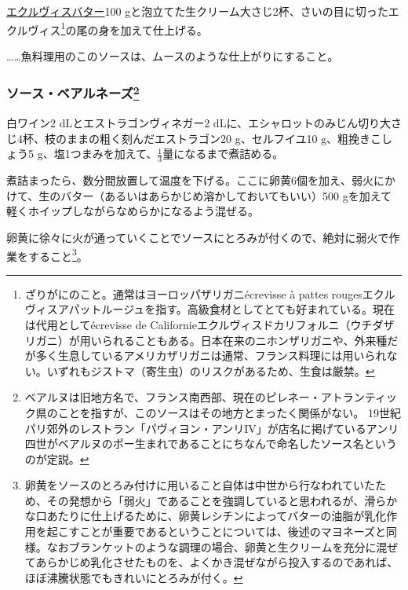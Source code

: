 \begin{recette}
\protect\hyperlink{beurre-d-ecrevisse}{エクルヴィスバター}100
gと泡立てた生クリーム大さじ2杯、さいの目に切ったエクルヴィス\footnote{ざりがにのこと。通常はヨーロッパザリガニécrevisse
  à pattes
  rougesエクルヴィスアパットルージュを指す。高級食材としてとても好まれている。現在は代用としてécrevisse
  de
  Californieエクルヴィスドカリフォルニ（ウチダザリガニ）が用いられることもある。日本在来のニホンザリガニや、外来種だが多く生息しているアメリカザリガニは通常、フランス料理には用いられない。いずれもジストマ（寄生虫）のリスクがあるため、生食は厳禁。}の尾の身を加えて仕上げる。

\ldots{}\ldots{}魚料理用のこのソースは、ムースのような仕上がりにすること。

\hypertarget{sauce-bearnaise}{%
\subsubsection[ソース・ベアルネーズ]{\texorpdfstring{ソース・ベアルネーズ\footnote{ベアルヌは旧地方名で、フランス南西部、現在のピレネー・アトランティック県のことを指すが、このソースはその地方とまったく関係がない。
  19世紀パリ郊外のレストラン「パヴィヨン・アンリIV」が店名に掲げているアンリ四世がベアルヌのポー生まれであることにちなんで命名したソース名というのが定説。}}{ソース・ベアルネーズ}}\label{sauce-bearnaise}}



白ワイン2 dLとエストラゴンヴィネガー2
dLに、エシャロットのみじん切り大さじ4杯、枝のままの粗く刻んだエストラゴン20
g、セルフイユ10 g、粗挽きこしょう5
g、塩1つまみを加えて、\(\frac{1}{3}\)量になるまで煮詰める。

煮詰まったら、数分間放置して温度を下げる。ここに卵黄6個を加え、弱火にかけて、生のバター（あるいはあらかじめ溶かしておいてもいい）500
gを加えて軽くホイップしながらなめらかになるよう混ぜる。

卵黄に徐々に火が通っていくことでソースにとろみが付くので、絶対に弱火で作業をすること\footnote{卵黄をソースのとろみ付けに用いること自体は中世から行なわれていたため、その発想から「弱火」であることを強調していると思われるが、滑らかな口あたりに仕上げるために、卵黄レシチンによってバターの油脂が乳化作用を起こすことが重要であるということについては、後述のマヨネーズと同様。なおブランケットのような調理の場合、卵黄と生クリームを充分に混ぜてあらかじめ乳化させたものを、よくかき混ぜながら投入するのであれば、ほぼ沸騰状態でもきれいにとろみが付く。}。


\end{recette}
